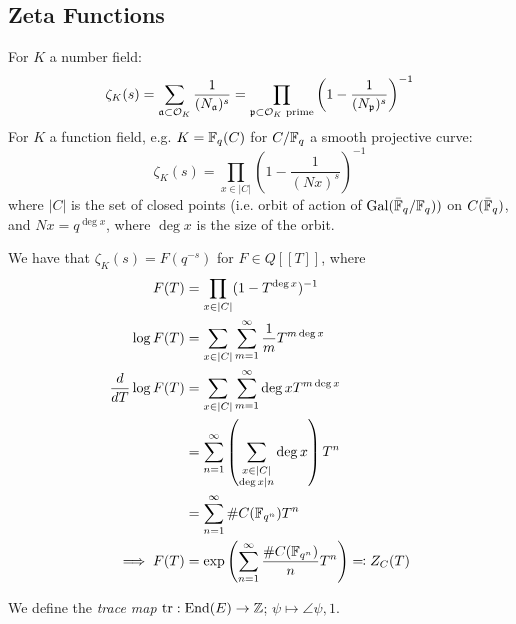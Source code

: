 \documentclass[10pt,a4paper]{article}
\begin{document}
\subsection{Zeta Functions}
For $K$ a number field:
\[\zeta_K(s) = \sum_{\mathfrak{a} \subset \mathcal{O}_K} \frac{1}{(N_{\mathfrak{a}})^s} = \prod_{\mathfrak{p}\subset \mathcal{O}_K \text{ prime}} \left(1-\frac{1}{(N_{\mathfrak{p}})^s}\right)^{-1}\]
For $K$ a function field, e.g. $K = \mathbb{F}_q(C)$ for $C/\mathbb{F}_q$ a smooth projective curve:
\[\zeta_K(s) = \prod_{x\in |C|}\left(1-\frac{1}{(Nx)^s}\right)^{-1}\]
where $|C|$ is the set of closed points (i.e. orbit of action of $\operatorname{Gal}(\bar{\mathbb{F}}_q/\mathbb{F}_q))$ on $C(\bar{\mathbb{F}}_q)$, and $Nx = q^{\deg x}$, where $\deg x$ is the size of the orbit.

We have that $\zeta_K(s) = F(q^{-s})$ for $F \in Q[[T]]$, where
\begin{align*}
  F(T) &= \prod_{x \in |C|} (1-T^{\deg x})^{-1}\\
  \log F(T) &= \sum_{x \in |C|} \sum_{m=1}^\infty \frac{1}{m}T^{m\deg x}\\
  \frac{d}{dT} \log F(T) &= \sum_{x \in |C|}\sum_{m=1}^\infty \deg x T^{m \deg x}\\
  &= \sum_{n=1}^\infty \left(\sum_{\substack{x \in |C|\\\deg x |n}} \deg x\right)T^n\\
  &= \sum_{n=1}^\infty \# C(\mathbb{F}_{q^n})T^n\\
  \implies F(T) &= \exp\left(\sum_{n=1}^\infty \frac{\#C(\mathbb{F}_{q^n})}{n}T^n\right) \eqqcolon Z_C(T)
\end{align*}

We define the \emph{trace map} $\operatorname{tr}: \operatorname{End}(E) \to \mathbb{Z}$; $\psi \mapsto \angle{\psi, 1}$.
\end{document}
